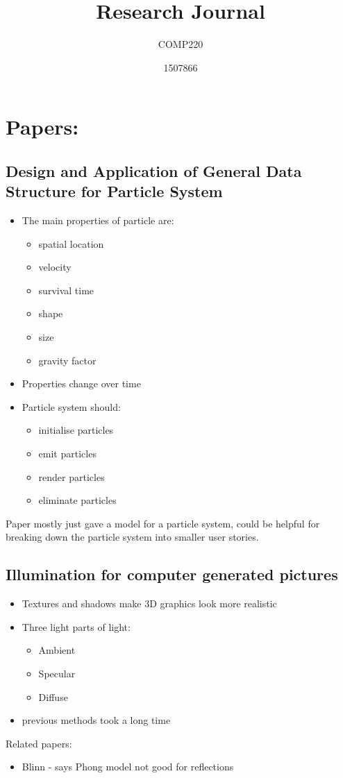 \documentclass{scrartcl}
\title{Research Journal}
\subtitle{COMP220}
\author{1507866}
\begin{document}
	
\maketitle

	
\section{Papers:}
\subsection{Design and Application of General Data Structure for Particle System \cite{Huang}}
\begin{itemize}
	\item The main properties of particle are:
	\begin{itemize}
		\item spatial location
		\item velocity
		\item survival  time
		\item shape
		\item size
		\item gravity factor 
	\end{itemize}
	\item Properties change over time 
	\item Particle system should:
		\begin{itemize}
			\item initialise particles
			\item emit particles
			\item render particles
			\item eliminate particles 
		\end{itemize}
\end{itemize}

Paper mostly just gave a model for a particle system, could be helpful for breaking down the particle system into smaller user stories.


\subsection{Illumination for computer generated pictures \cite{Phong}}
\begin{itemize}
	\item Textures and shadows make 3D graphics look more realistic
	\item Three light parts of light:
	\begin{itemize}
		\item Ambient
		\item Specular
		\item Diffuse
	\end{itemize}
	\item previous methods took a long time
	
\end{itemize}
Related papers: \begin{itemize}
	\item Blinn \cite{Blinn} - says Phong model not good for reflections
\end{itemize}
\end{document}

